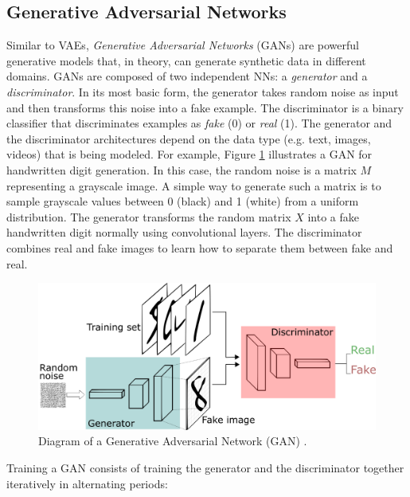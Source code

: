 \subsection{Generative Adversarial Networks}

Similar to VAEs, \textit{Generative Adversarial Networks} (GANs) \cite{goodfellow2014generative} are powerful generative models that, in theory, can generate synthetic data in different domains. GANs are composed of two independent NNs: a \textit{generator} and a \textit{discriminator}. In its most basic form, the generator takes random noise as input and then transforms this noise into a fake example. The discriminator is a binary classifier that discriminates examples as \textit{fake} (0) or \textit{real} (1). The generator and the discriminator architectures depend on the data type (e.g. text, images, videos) that is being modeled. For example, Figure \ref{fig:gan} illustrates a GAN for handwritten digit generation. In this case, the random noise is a matrix $M$ representing a grayscale image. A simple way to generate such a matrix is to sample grayscale values between 0 (black) and 1 (white) from a uniform distribution. The generator transforms the random matrix $X$ into a fake handwritten digit normally using convolutional layers. The discriminator combines real and fake images to learn how to separate them between fake and real.

\begin{figure}[!h]
 \centering
 \includegraphics[width=\columnwidth]{imgs/background/gan.png}
 \caption{Diagram of a Generative Adversarial Network (GAN) \cite{silva2018intuitive}.}
 \label{fig:gan}
\end{figure}

Training a GAN consists of training the generator and the discriminator together
iteratively in alternating periods:

